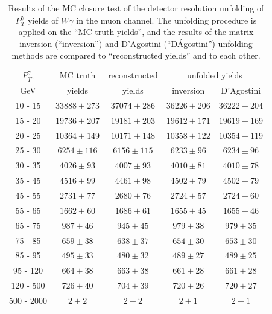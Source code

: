 \begin{table}[h]
  \scriptsize
  \begin{center}
  \caption{Results of the MC closure test of the detector resolution unfolding of $P_T^{\gamma}$ yields of $W\gamma$ in the muon channel. The unfolding procedure is applied on the ``MC truth yields'', and the results of the matrix inversion (``inversion'') and D'Agostini (``D\'Agostini'') unfolding methods are compared to ``reconstructed yields'' and to each other.}
  \begin{tabular}{|c|c|c|c|c|}
  \hline
  $P_T^{\gamma}$,&  MC truth         &   reconstructed &  \multicolumn{2}{|c|}{unfolded yields} \\ 
  GeV          &  yields       &       yields        &  inversion &  D'Agostini \\ \hline
 10 -  15 &     $33888\pm 273$ &     $37074\pm 286$ &     $36226\pm206$ &     $36222\pm204$ \\ \hline
 15 -  20 &     $19736\pm 207$ &     $19181\pm 203$ &     $19612\pm171$ &     $19619\pm169$ \\ \hline
 20 -  25 &     $10364\pm 149$ &     $10171\pm 148$ &     $10358\pm122$ &     $10354\pm119$ \\ \hline
 25 -  30 &     $6254\pm 116$ &     $6156\pm 115$ &     $6233\pm96$ &     $6234\pm96$ \\ \hline
 30 -  35 &     $4026\pm  93$ &     $4007\pm  93$ &     $4010\pm81$ &     $4010\pm78$ \\ \hline
 35 -  45 &     $4516\pm  99$ &     $4461\pm  98$ &     $4502\pm79$ &     $4502\pm79$ \\ \hline
 45 -  55 &     $2731\pm  77$ &     $2680\pm  76$ &     $2724\pm57$ &     $2724\pm60$ \\ \hline
 55 -  65 &     $1662\pm  60$ &     $1686\pm  61$ &     $1655\pm45$ &     $1655\pm46$ \\ \hline
 65 -  75 &     $987\pm  46$ &     $945\pm  45$ &     $979\pm38$ &     $979\pm35$ \\ \hline
 75 -  85 &     $659\pm  38$ &     $638\pm  37$ &     $654\pm30$ &     $653\pm30$ \\ \hline
 85 -  95 &     $495\pm  33$ &     $480\pm  32$ &     $489\pm27$ &     $489\pm25$ \\ \hline
 95 - 120 &     $664\pm  38$ &     $663\pm  38$ &     $661\pm28$ &     $661\pm28$ \\ \hline
120 - 500 &     $726\pm  40$ &     $704\pm  39$ &     $720\pm26$ &     $720\pm27$ \\ \hline
500 - 2000 &     $2\pm   2$ &     $2\pm   2$ &     $2\pm1$ &     $2\pm1$ \\ \hline
  \end{tabular}
  \label{tab:unf_mc_closure_MUON_WGamma}
  \end{center}
\end{table}

